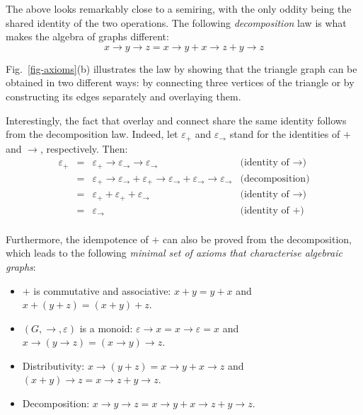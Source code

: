 \noindent
The above looks remarkably close to a semiring, with the only oddity being the shared
identity of the two operations. The following \emph{decomposition} law is
what makes the algebra of graphs different:
\[
x \rightarrow y \rightarrow z = x \rightarrow y + x \rightarrow z + y \rightarrow z
\]

\noindent
Fig.~\ref{fig-axioms}(b) illustrates the law by showing that the triangle
graph can be obtained in two different ways: by connecting three vertices
of the triangle or by constructing its edges separately and overlaying them.

Interestingly, the fact that overlay and connect share the same identity
follows from the decomposition law. Indeed, let $\varepsilon_{+}$ and
$\varepsilon_{\rightarrow}$ stand for the identities of $+$ and $\rightarrow$,
respectively. Then:
\[
\begin{array}{rcll}
\varepsilon_{+} & = & \varepsilon_{+} \rightarrow \varepsilon_{\rightarrow} \rightarrow \varepsilon_{\rightarrow} & \text{(identity of $\rightarrow$)}\\
 & = & \varepsilon_{+} \rightarrow \varepsilon_{\rightarrow} + \varepsilon_{+} \rightarrow \varepsilon_{\rightarrow} + \varepsilon_{\rightarrow} \rightarrow \varepsilon_{\rightarrow} & \text{(decomposition)}\\
 & = & \varepsilon_{+} + \varepsilon_{+} + \varepsilon_{\rightarrow} & \text{(identity of $\rightarrow$)}\\
 & = & \varepsilon_{\rightarrow} & \text{(identity of $+$)}\\
\end{array}
\]

\noindent
Furthermore, the idempotence of $+$ can also be proved from the decomposition, which
leads to the following \emph{minimal set of axioms that characterise algebraic graphs}:

\begin{itemize}
    \item $+$ is commutative and associative: $x + y = y + x$ and
    $x + (y + z) = (x + y) + z$.
    \item $(G, \rightarrow, \varepsilon)$ is a monoid:
    $\varepsilon \rightarrow x = x \rightarrow \varepsilon = x$ and
    $x \rightarrow (y \rightarrow z) = (x \rightarrow y) \rightarrow z$.
    \item Distributivity:
    $x \rightarrow (y + z) = x \rightarrow y + x \rightarrow z$ and
    $(x + y) \rightarrow z = x \rightarrow z + y \rightarrow z$.
    \item Decomposition: $x \rightarrow y \rightarrow z =
    x \rightarrow y + x \rightarrow z + y \rightarrow z$.
\end{itemize}

